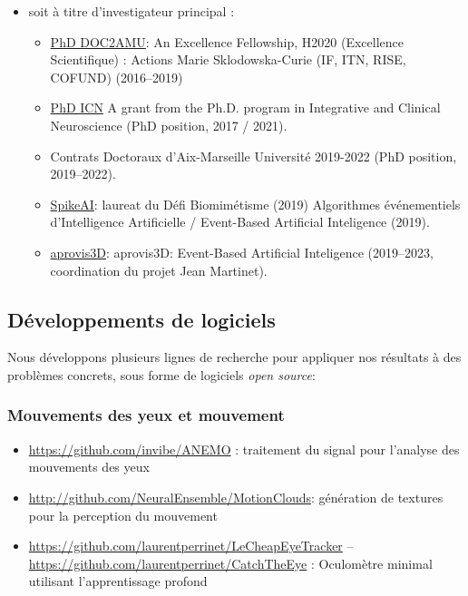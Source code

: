 \begin{itemize}
\item soit à titre d'investigateur principal :
\begin{itemize}
	\item  \href{https://laurentperrinet.github.io/project/doc-2-amu/}{PhD DOC2AMU}: An Excellence Fellowship, H2020 (Excellence Scientifique) : Actions Marie Sklodowska-Curie (IF, ITN, RISE, COFUND) (2016--2019) 

	\item \href{https://laurentperrinet.github.io/project/phd-icn/}{PhD ICN} A grant from the Ph.D. program in Integrative and Clinical Neuroscience (PhD position, 2017 / 2021).
	\item Contrats Doctoraux d’Aix-Marseille Université 2019-2022 (PhD position, 2019--2022).
	\item  \href{https://laurentperrinet.github.io/project/spikeai/}{SpikeAI}: laureat du Défi Biomimétisme (2019) Algorithmes événementiels d’Intelligence Artificielle / Event-Based Artificial Inteligence (2019).
	\item  \href{https://laurentperrinet.github.io/project/aprovis3D/}{aprovis3D}: aprovis3D: Event-Based Artificial Inteligence (2019--2023, coordination du projet Jean Martinet).

\end{itemize}

\end{itemize}

\subsection{Développements de logiciels} %

Nous développons plusieurs lignes de recherche pour appliquer nos résultats à des problèmes concrets, sous forme de logiciels \emph{open source}:
\subsubsection{Mouvements des yeux et mouvement} %
\begin{itemize}

	\item \url{https://github.com/invibe/ANEMO} : traitement du signal pour l'analyse des mouvements des yeux
	\item \url{http://github.com/NeuralEnsemble/MotionClouds}: génération de textures pour la perception du mouvement~\citep{Sanz12,Vacher15nips,Vacher16}
	\item \url{https://github.com/laurentperrinet/LeCheapEyeTracker} -- \url{https://github.com/laurentperrinet/CatchTheEye} : Oculomètre minimal
utilisant l'apprentissage profond
\end{itemize}

